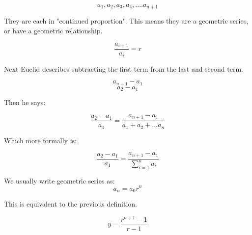 \documentclass{report}
\begin{document}
\begin{description}
\begin{mdframed}
            \begin{displaymath}
                a_1, a_2, a_3, a_4, .... a_{n+1}
            \end{displaymath}

            They are each in "continued proportion".
            This means they are a geometric series, or
            have a geometric relationship.

            \begin{displaymath}
                \frac{a_{i+1}}{a_i} = r
            \end{displaymath}

            Next Euclid describes subtracting the first term
            from the last and second term.

            \begin{displaymath}
                a_{n+1} - a_1
            \end{displaymath}
            \begin{displaymath}
                a_2 - a_1
            \end{displaymath}

            Then he says:

            \begin{displaymath}
                \frac{a_2 - a_1}{a_1} = 
                \frac{a_{n+1} - a_1}{a_1 + a_2 + ... a_n}
            \end{displaymath}

            Which more formally is:

            \begin{displaymath}
                \frac{a_2 - a_1}{a_1} = 
                \frac{a_{n+1} - a_1}{\sum_{i=1}^n a_i}
            \end{displaymath}
            
            We usually write geometric series as:
            \begin{displaymath}
                a_n = a_0 r^{n}
            \end{displaymath}

            This is equivalent to the previous definition.

            \begin{displaymath}
                y = \frac{r^{n+1}-1}{r-1}
            \end{displaymath}
            

\end{mdframed}
\end{description}
\end{document}
